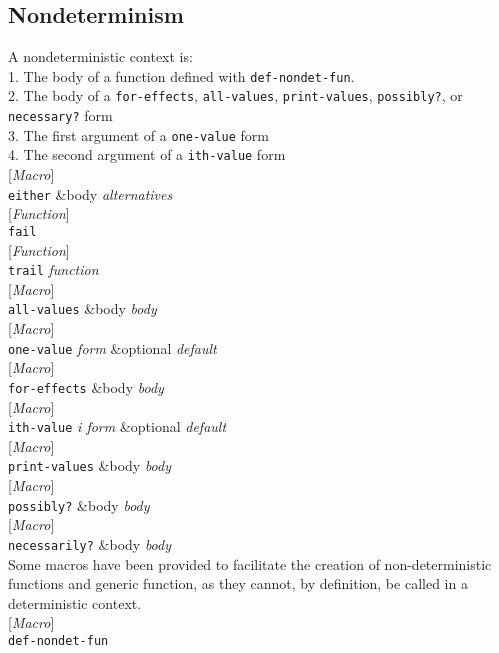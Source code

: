 \documentclass[10pt]{book}
\newenvironment{defother}[2]{[\textit{#1}]\\\texttt{#2}}{\\}
\newenvironment{defun}[1]{\begin{defother}{Function}{#1}}{\end{defother}}
\newenvironment{defmacro}[1]{\begin{defother}{Macro}{#1}}{\end{defother}}
\begin{document}
\subsection{Nondeterminism}
A nondeterministic context is:\\
1. The body of a function defined with \texttt{def-nondet-fun}.\\%
2. The body of a \texttt{for-effects}, \texttt{all-values}, \texttt{print-values}, \texttt{possibly?}, or \texttt{necessary?} form\\
3. The first argument of a \texttt{one-value} form\\
4. The second argument of a \texttt{ith-value} form\\
\begin{defmacro}{either} \&body \textit{alternatives}\end{defmacro}
\begin{defun}{fail} \end{defun}
\begin{defun}{trail} \textit{function} \end{defun}
\begin{defmacro}{all-values} \&body \textit{body} \end{defmacro}
\begin{defmacro}{one-value} \textit{form} \&optional \textit{default}\end{defmacro}
\begin{defmacro}{for-effects} \&body \textit{body}\end{defmacro}
\begin{defmacro}{ith-value} \textit{i form} \&optional \textit{default} \end{defmacro}
\begin{defmacro}{print-values} \&body \textit{body}\end{defmacro}
\begin{defmacro}{possibly?} \&body \textit{body}\end{defmacro}
\begin{defmacro}{necessarily?} \&body \textit{body}\end{defmacro}
Some macros have been provided to facilitate the creation of non-deterministic functions and generic function, as they cannot, by definition, be called in a deterministic context.\\
\begin{defmacro}{def-nondet-fun}\end{defmacro} %
\end{document}
